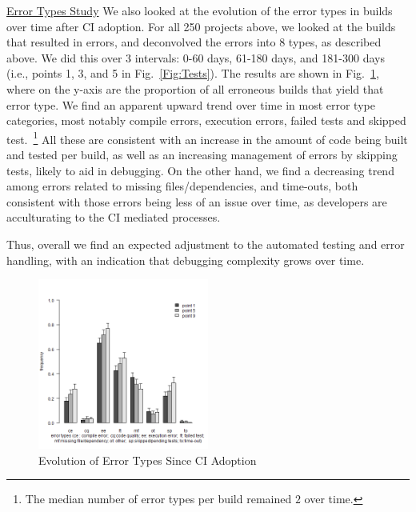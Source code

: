 \noindent \underline{Error Types Study}
We also looked at the evolution of the error types in builds over time after CI adoption.
For all 250 projects above, we looked at the builds that resulted in errors, and deconvolved the 
errors into 8 types, as described above.
We did this over 3 intervals: 0-60 days, 61-180 days, and 181-300 days (i.e., points 1, 3, and  5 in Fig.~\ref{Fig:Tests}).
The results are shown in Fig.~\ref{Fig:BugTypes}, where
on the y-axis are the proportion of all erroneous builds that yield that error type.
We find an apparent upward trend over time in most error type categories, most notably compile errors, execution errors, failed tests and skipped test.~\footnote{The median number of error types per build remained $2$ over time.}
All these are consistent with an increase in the amount of code being built and tested per build, as well as an increasing management of errors by skipping tests, likely to aid in debugging.
On the other hand, we find a decreasing trend among errors related to missing files/dependencies, and time-outs, both consistent with those errors being less of an issue over time, as developers are acculturating to the CI mediated processes.

Thus, overall we find an expected adjustment to the automated testing and error handling, with an indication that debugging complexity grows over time.

\begin{figure}[!t]
\centering
\includegraphics[width=0.5\textwidth]{plot_together.png}
\caption{Evolution of Error Types Since CI Adoption}
\label{Fig:BugTypes}
\end{figure}




